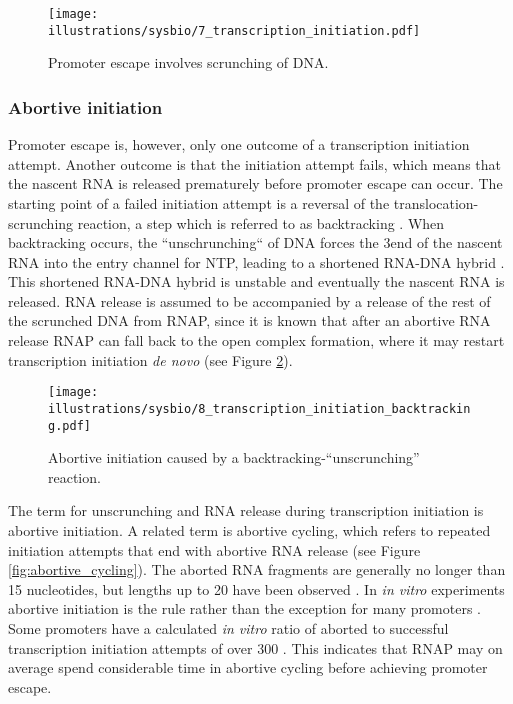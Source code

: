 \begin{figure}[htb]
	\begin{center}
		\texttt{[image: illustrations/sysbio/7\_transcription\_initiation.pdf]}
	\end{center}
	\caption{Promoter escape involves scrunching of DNA.}
	\label{fig:simple_escape}
\end{figure}

\subsubsection{Abortive initiation}
Promoter escape is, however, only one outcome of a transcription initiation
attempt. Another outcome is that the initiation attempt fails, which means that
the nascent RNA is released prematurely before promoter escape can occur. The
starting point of a failed initiation attempt is a reversal of the
translocation-scrunching reaction, a step which is referred to as backtracking
\cite{hsu_initial_2006}. When backtracking occurs, the ``unschrunching`` of
DNA forces the 3\ppp end of the nascent RNA into the entry channel for NTP,
leading to a shortened RNA-DNA hybrid \cite{hsu_initial_2006}. This shortened
RNA-DNA hybrid is unstable and eventually the nascent RNA is released. RNA
release is assumed to be accompanied by a release of the rest of the scrunched
DNA from RNAP, since it is known that after an abortive RNA release RNAP can
fall back to the open complex formation, where it may restart transcription
initiation \textit{de novo} \cite{hsu_promoter_2002} (see Figure
\ref{fig:abortive_backtrack}).

\begin{figure}[htb]
	\begin{center}
		\texttt{[image: illustrations/sysbio/8\_transcription\_initiation\_backtracking.pdf]}
	\end{center}
	\caption{Abortive initiation caused by a backtracking-``unscrunching''
	reaction.}
	\label{fig:abortive_backtrack}
\end{figure}

The term for unscrunching and RNA release during transcription initiation is
abortive initiation. A related term is abortive cycling, which refers to
repeated initiation attempts that end with abortive RNA release (see Figure
\ref{fig:abortive_cycling}). The aborted RNA fragments are generally no longer
than 15 nucleotides, but lengths up to 20 have been observed
\cite{chander_alternate_2007}. In \textit{in vitro} experiments abortive
initiation is the rule rather than the exception for many promoters
\cite{hsu_promoter_2002}. Some promoters have a calculated \textit{in vitro}
ratio of aborted to successful transcription initiation attempts of over 300
\cite{hsu_initial_2006}. This indicates that RNAP may on average spend
considerable time in abortive cycling before achieving promoter escape.

